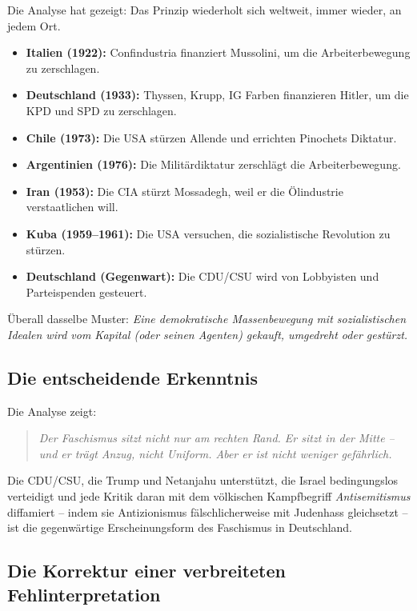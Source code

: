 Die Analyse hat gezeigt: Das Prinzip wiederholt sich weltweit, immer wieder, an jedem Ort.

\begin{itemize}
    \item \textbf{Italien (1922):} Confindustria finanziert Mussolini, um die Arbeiterbewegung zu zerschlagen.
    \item \textbf{Deutschland (1933):} Thyssen, Krupp, IG Farben finanzieren Hitler, um die KPD und SPD zu zerschlagen.
    \item \textbf{Chile (1973):} Die USA stürzen Allende und errichten Pinochets Diktatur.
    \item \textbf{Argentinien (1976):} Die Militärdiktatur zerschlägt die Arbeiterbewegung.
    \item \textbf{Iran (1953):} Die CIA stürzt Mossadegh, weil er die Ölindustrie verstaatlichen will.
    \item \textbf{Kuba (1959--1961):} Die USA versuchen, die sozialistische Revolution zu stürzen.
    \item \textbf{Deutschland (Gegenwart):} Die CDU/CSU wird von Lobbyisten und Parteispenden gesteuert.
\end{itemize}

Überall dasselbe Muster: \emph{Eine demokratische Massenbewegung mit sozialistischen Idealen wird vom Kapital (oder seinen Agenten) gekauft, umgedreht oder gestürzt.}

\subsection{Die entscheidende Erkenntnis}

Die Analyse zeigt:

\begin{quote}
\emph{Der Faschismus sitzt nicht nur am rechten Rand. Er sitzt in der Mitte -- und er trägt Anzug, nicht Uniform. Aber er ist nicht weniger gefährlich.}
\end{quote}

Die CDU/CSU, die Trump und Netanjahu unterstützt, die Israel bedingungslos verteidigt und jede Kritik daran mit dem völkischen Kampfbegriff \emph{Antisemitismus} diffamiert -- indem sie Antizionismus fälschlicherweise mit Judenhass gleichsetzt -- ist die gegenwärtige Erscheinungsform des Faschismus in Deutschland.

\subsection{Die Korrektur einer verbreiteten Fehlinterpretation}

